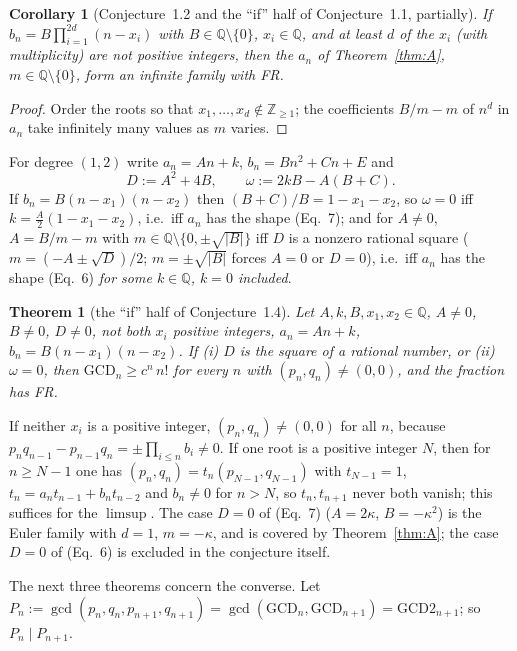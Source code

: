 \documentclass[11pt]{amsart}
\newtheorem{theorem}{Theorem}
\newtheorem{corollary}[lemma]{Corollary}
\theoremstyle{definition}
\theoremstyle{remark}
\numberwithin{equation}{section}
\newcommand{\Q}{\mathbb{Q}}
\newcommand{\Z}{\mathbb{Z}}
\newcommand{\GCD}{\mathrm{GCD}}
\begin{document}
\begin{corollary}[Conjecture~1.2 and the ``if'' half of Conjecture~1.1, partially]\label{cor:12}
If $b_n=B\prod_{i=1}^{2d}(n-x_i)$ with $B\in\Q\setminus\{0\}$, $x_i\in\Q$, and at least $d$ of the $x_i$ (with multiplicity) are not positive integers, then the $a_n$ of Theorem~\ref{thm:A}, $m\in\Q\setminus\{0\}$, form an infinite family with FR.
\end{corollary}

\begin{proof}
Order the roots so that $x_1,\dots,x_d\notin\Z_{\ge1}$; the coefficients $B/m-m$ of $n^d$ in $a_n$ take infinitely many values as $m$ varies.
\end{proof}

For degree $(1,2)$ write $a_n=An+k$, $b_n=Bn^2+Cn+E$ and
\[
D:=A^2+4B,\qquad\omega:=2kB-A(B+C).
\]
If $b_n=B(n-x_1)(n-x_2)$ then $(B+C)/B=1-x_1-x_2$, so $\omega=0$ iff $k=\frac A2(1-x_1-x_2)$, i.e.\ iff $a_n$ has the shape (Eq.~7); and for $A\neq0$, $A=B/m-m$ with $m\in\Q\setminus\{0,\pm\sqrt{|B|}\}$ iff $D$ is a nonzero rational square ($m=(-A\pm\sqrt D)/2$; $m=\pm\sqrt{|B|}$ forces $A=0$ or $D=0$), i.e.\ iff $a_n$ has the shape (Eq.~6) \emph{for some $k\in\Q$, $k=0$ included}.

\begin{theorem}[the ``if'' half of Conjecture~1.4]\label{thm:B}
Let $A,k,B,x_1,x_2\in\Q$, $A\ne0$, $B\neq0$, $D\neq0$, not both $x_i$ positive integers, $a_n=An+k$, $b_n=B(n-x_1)(n-x_2)$. If \textup{(i)} $D$ is the square of a rational number, or \textup{(ii)} $\omega=0$, then $\GCD_n\ge c^n\,n!$ for every $n$ with $(p_n,q_n)\neq(0,0)$, and the fraction has FR.
\end{theorem}

If neither $x_i$ is a positive integer, $(p_n,q_n)\neq(0,0)$ for all $n$, because $p_nq_{n-1}-p_{n-1}q_n=\pm\prod_{i\le n}b_i\neq0$. If one root is a positive integer $N$, then for $n\ge N-1$ one has $(p_n,q_n)=t_n(p_{N-1},q_{N-1})$ with $t_{N-1}=1$, $t_n=a_nt_{n-1}+b_nt_{n-2}$ and $b_n\neq0$ for $n>N$, so $t_n,t_{n+1}$ never both vanish; this suffices for the $\limsup$. The case $D=0$ of (Eq.~7) ($A=2\kappa$, $B=-\kappa^2$) is the Euler family with $d=1$, $m=-\kappa$, and is covered by Theorem~\ref{thm:A}; the case $D=0$ of (Eq.~6) is excluded in the conjecture itself.

The next three theorems concern the converse. Let $P_n:=\gcd(p_n,q_n,p_{n+1},q_{n+1})=\gcd(\GCD_n,\GCD_{n+1})=\GCD2_{n+1}$; so $P_n\mid P_{n+1}$.
\end{document}
